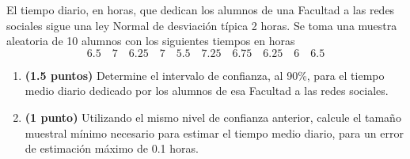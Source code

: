 
El tiempo diario, en horas, que dedican los alumnos de una Facultad a las redes sociales sigue una ley Normal de desviación típica 2 horas. Se toma una muestra aleatoria de 10 alumnos con los siguientes tiempos en horas
\[
6.5\quad7\quad6.25\quad7\quad5.5\quad7.25\quad6.75\quad6.25\quad6\quad6.5
\]
\begin{enumerate}[label=\alph*)]
\item \textbf{(1.5 puntos)} Determine el intervalo de confianza, al 90\%, para el tiempo medio diario dedicado por los alumnos de esa Facultad a las redes sociales.
\item \textbf{(1 punto)} Utilizando el mismo nivel de confianza anterior, calcule el tamaño muestral mínimo necesario para estimar el tiempo medio diario, para un error de estimación máximo de 0.1 horas.
\end{enumerate}
